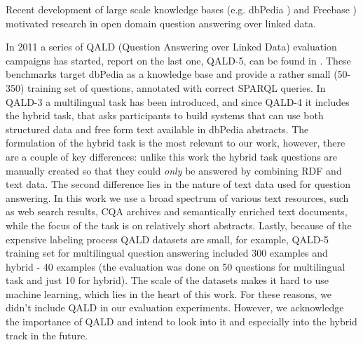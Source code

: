 
Recent development of large scale knowledge bases (e.g. dbPedia \cite{auer2007dbpedia}) and Freebase \cite{Bollacker:2008:FCC:1376616.1376746}) motivated research in open domain question answering over linked data.

In 2011 a series of QALD (Question Answering over Linked Data) evaluation campaigns has started, report on the last one, QALD-5, can be found in \cite{UngerFLNCCW15}.
These benchmarks target dbPedia as a knowledge base and provide a rather small (50-350) training set of questions, annotated with correct SPARQL queries.
In QALD-3 a multilingual task has been introduced, and since QALD-4 it includes the hybrid task, that asks participants to build systems that can use both structured data and free form text available in dbPedia abstracts.
The formulation of the hybrid task is the most relevant to our work, however, there are a couple of key differences: unlike this work the hybrid task questions are manually created so that they could \emph{only} be answered by combining RDF and text data.
The second difference lies in the nature of text data used for question answering.
In this work we use a broad spectrum of various text resources, such as web search results, CQA archives and semantically enriched text documents, while the focus of the task is on relatively short abstracts.
Lastly, because of the expensive labeling process QALD datasets are small, for example, QALD-5 training set for multilingual question answering included 300 examples and hybrid - 40 examples (the evaluation was done on 50 questions for multilingual task and just 10 for hybrid).
The scale of the datasets makes it hard to use machine learning, which lies in the heart of this work.
For these reasons, we didn't include QALD in our evaluation experiments.
However, we acknowledge the importance of QALD and intend to look into it and especially into the hybrid track in the future.

